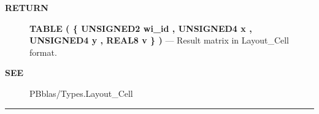 \par
\begin{description}
\item [\colorbox{tagtype}{\color{white} \textbf{\textsf{RETURN}}}] \textbf{TABLE ( \{ UNSIGNED2 wi\_id , UNSIGNED4 x , UNSIGNED4 y , REAL8 v \} )} --- Result matrix in Layout\_Cell format.
\end{description}






\par
\begin{description}
\item [\colorbox{tagtype}{\color{white} \textbf{\textsf{SEE}}}] PBblas/Types.Layout\_Cell
\end{description}




\rule{\linewidth}{0.5pt}
